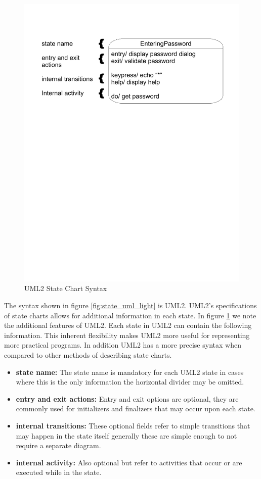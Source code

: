 \begin{figure}[htp]
    \centering
    \includegraphics[trim= 15mm 175mm 15mm 10mm, clip, width=\imgmedium]{./images/state_uml2_syntax_21_4.pdf} 
    \caption{UML2 State Chart Syntax \cite{UML2}}
    \label{fig:state_uml2}
\end{figure}

The syntax shown in figure \ref{fig:state_uml_light} is UML2. UML2's specifications of state charts allows for additional information in each state. In figure \ref{fig:state_uml2} we note the additional features of UML2. Each state in UML2 can contain the following information. This inherent flexibility makes UML2 more useful for representing more practical programs. In addition UML2 has a more precise syntax when compared to other methods of describing state charts.

\begin{itemize}
	\item \textbf{state name:} The state name is mandatory for each UML2 state in cases where this is the only information the horizontal divider may be omitted.
	\item \textbf{entry and exit actions:} Entry and exit options are optional, they are commonly used for initializers and finalizers that may occur upon each state.
	\item \textbf{internal transitions:} These optional fields refer to simple transitions that may happen in the state itself generally these are simple enough to not require a separate diagram.
	\item \textbf{internal activity:} Also optional but refer to activities that occur or are executed while in the state.
\end{itemize}

